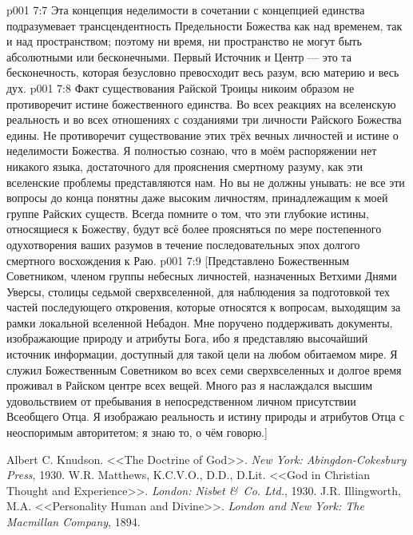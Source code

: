 \vs p001 7:7 Эта концепция неделимости в сочетании с концепцией единства подразумевает трансцендентность Предельности Божества как над временем, так и над пространством; поэтому ни время, ни пространство не могут быть абсолютными или бесконечными. Первый Источник и Центр --- это та бесконечность, которая безусловно превосходит весь разум, всю материю и весь дух.
\vs p001 7:8 Факт существования Райской Троицы никоим образом не противоречит истине божественного единства. Во всех реакциях на вселенскую реальность и во всех отношениях с созданиями три личности Райского Божества едины. Не противоречит существование этих трёх вечных личностей и истине о неделимости Божества. Я полностью сознаю, что в моём распоряжении нет никакого языка, достаточного для прояснения смертному разуму, как эти вселенские проблемы представляются нам. Но вы не должны унывать: не все эти вопросы до конца понятны даже высоким личностям, принадлежащим к моей группе Райских существ. Всегда помните о том, что эти глубокие истины, относящиеся к Божеству, будут всё более проясняться по мере постепенного одухотворения ваших разумов в течение последовательных эпох долгого смертного восхождения к Раю.
\vsetoff
\vs p001 7:9 [Представлено Божественным Советником, членом группы небесных личностей, назначенных Ветхими Днями Уверсы, столицы седьмой сверхвселенной, для наблюдения за подготовкой тех частей последующего откровения, которые относятся к вопросам, выходящим за рамки локальной вселенной Небадон. Мне поручено поддерживать документы, изображающие природу и атрибуты Бога, ибо я представляю высочайший источник информации, доступный для такой цели на любом обитаемом мире. Я служил Божественным Советником во всех семи сверхвселенных и долгое время проживал в Райском центре всех вещей. Много раз я наслаждался высшим удовольствием от пребывания в непосредственном личном присутствии Всеобщего Отца. Я изображаю реальность и истину природы и атрибутов Отца с неоспоримым авторитетом; я знаю то, о чём говорю.]
\quizlink
\begin{thebibliography}{100}
Albert C. Knudson.
{<<The Doctrine of God>>.}
{\em New York: Abingdon-Cokesbury Press}, 1930.
W.R. Matthews, K.C.V.O., D.D., D.Lit.
{<<God in Christian Thought and Experience>>.}
{\em London: Nisbet \&\ Co. Ltd.}, 1930.
J.R. Illingworth, M.A.
{<<Personality Human and Divine>>.}
{\em London and New York: The Macmillan Company}, 1894.
\end{thebibliography}
